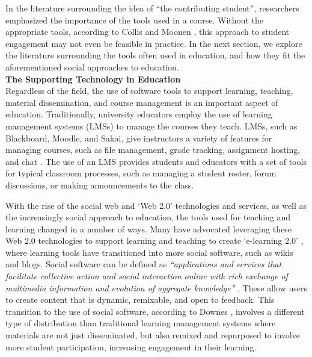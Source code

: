 In the literature surrounding the idea of ``the contributing student'', researchers emphasized the importance of the tools used in a course. Without the appropriate tools, according to Collis and Moonen \cite{collis2006contributing}, this approach to student engagement may not even be feasible in practice. In the next section, we explore the literature surrounding the tools often used in education, and how they fit the aforementioned social approaches to education. \\

\textbf{The Supporting Technology in Education} \\
Regardless of the field, the use of software tools to support learning, teaching, material dissemination, and course management is an important aspect of education. Traditionally, university educators employ the use of learning management systems (LMSs) to manage the courses they teach. LMSs, such as Blackboard, Moodle, and Sakai, give instructors a variety of features for managing courses, such as file management, grade tracking, assignment hosting, and chat \cite{kumar2011comparative}. The use of an LMS provides students and educators with a set of tools for typical classroom processes, such as managing a student roster, forum discussions, or making announcements to the class.

With the rise of the social web and `Web 2.0' technologies and services, as well as the increasingly social approach to education, the tools used for teaching and learning changed in a number of ways. Many have advocated leveraging these Web 2.0 technologies to support learning and teaching to create `e-learning 2.0' \cite{downes2005feature}, where learning tools have transitioned into more social software, such as wikis and blogs. Social software can be defined as \textit{``applications and services that facilitate collective action and social interaction online with rich exchange of multimedia information and evolution of aggregate knowledge''} \cite{parameswaran2007social}. These allow users to create content that is dynamic, remixable, and open to feedback. This transition to the use of social software, according to Downes \cite{downes2005feature}, involves a different type of distribution than traditional learning management systems where materials are not just disseminated, but also remixed and repurposed to involve more student participation, increasing engagement in their learning.

